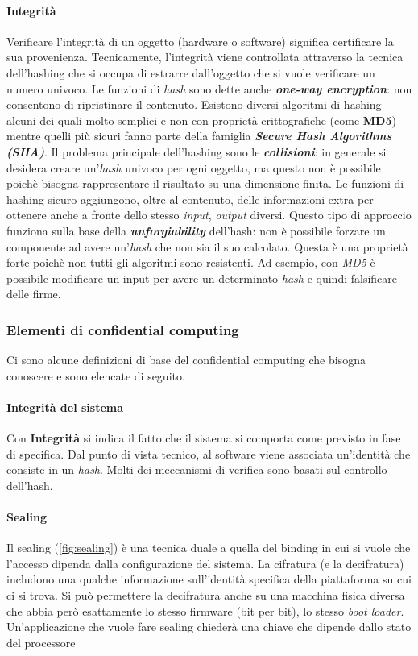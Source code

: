 \documentclass{article}
\begin{document}
\paragraph{Integrità} Verificare l'integrità di un oggetto (hardware o software) significa certificare la sua provenienza. Tecnicamente, l'integrità viene controllata attraverso la tecnica dell'hashing che si occupa di estrarre dall'oggetto che si vuole verificare un numero univoco. Le funzioni di \textit{hash} sono dette anche \textbf{\textit{one-way encryption}}: non consentono di ripristinare il contenuto. Esistono diversi algoritmi di hashing alcuni dei quali molto semplici e non con proprietà crittografiche (come \textbf{MD5}) mentre quelli più sicuri fanno parte della famiglia \textbf{\textit{Secure Hash Algorithms (SHA)}}. Il problema principale dell'hashing sono le \textbf{\textit{collisioni}}: in generale si desidera creare un'\textit{hash} univoco per ogni oggetto, ma questo non è possibile poichè bisogna rappresentare il risultato su una dimensione finita. Le funzioni di hashing sicuro aggiungono, oltre al contenuto, delle informazioni extra per ottenere anche a fronte dello stesso \textit{input}, \textit{output} diversi. Questo tipo di approccio funziona sulla base della \textbf{\textit{unforgiability}} dell'hash: non è possibile forzare un componente ad avere un'\textit{hash} che non sia il suo calcolato. Questa è una proprietà forte poichè non tutti gli algoritmi sono resistenti. Ad esempio, con \textit{MD5} è possibile modificare un input per avere un determinato \textit{hash} e quindi falsificare delle firme.

\subsubsection{Elementi di confidential computing}
Ci sono alcune definizioni di base del confidential computing che bisogna conoscere e sono elencate di seguito.

\paragraph{Integrità del sistema}
Con \textbf{Integrità} si indica il fatto che il sistema si comporta come previsto in fase di specifica. Dal punto di vista tecnico, al software viene associata un'identità che consiste in un \textit{hash}. Molti dei meccanismi di verifica sono basati sul controllo dell'hash.

\paragraph{Sealing}
Il sealing (\cref{fig:sealing}) è una tecnica duale a quella del binding in cui si vuole che l'accesso dipenda dalla configurazione del sistema. La cifratura (e la decifratura) includono una qualche informazione sull'identità specifica della piattaforma su cui ci si trova. Si può permettere la decifratura anche su una macchina fisica diversa che abbia però esattamente lo stesso firmware (bit per bit), lo stesso \textit{boot loader}. Un'applicazione che vuole fare sealing chiederà una chiave che dipende dallo stato del processore
\end{document}
